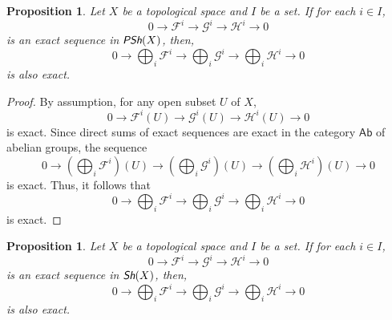 \documentclass[oneside,11pt]{amsart}
\newtheorem{prop}[thm]{Proposition}
\theoremstyle{definition}
\theoremstyle{remark}
\begin{document}
\begin{prop}\label{prop1}
 Let $X$ be a topological space and $I$ be a set. If for each $i\in I$,
 \begin{equation*}
 0 \longrightarrow  \mathscr{F}^{i} \longrightarrow \mathscr{G}^{i} \longrightarrow \mathscr{H}^{i} \longrightarrow 0  
 \end{equation*}
 is an exact sequence in $\emph{\textsf{PSh}}(X)$, then,
 \begin{equation*}
   0 \longrightarrow  \bigoplus_{i}\mathscr{F}^{i} \longrightarrow \bigoplus_{i}\mathscr{G}^{i} \longrightarrow \bigoplus_{i}\mathscr{H}^{i} \longrightarrow 0 
 \end{equation*}
 is also exact.
\end{prop}
\begin{proof}
By assumption, for any open subset $U$ of $X$,
\begin{equation*}
 0 \longrightarrow \mathscr{F}^{i}(U)  \longrightarrow \mathscr{G}^{i}(U) \longrightarrow \mathscr{H}^{i}(U) \longrightarrow 0
\end{equation*}
is exact. Since direct sums of exact sequences are exact in the category $\textsf{Ab}$ of abelian groups, the sequence
\begin{equation*}
 0 \longrightarrow \left(\bigoplus_{i} \mathscr{F}^{i}\right)(U)  \longrightarrow  \left(\bigoplus_{i}\mathscr{G}^{i}\right)(U) \longrightarrow \left(\bigoplus_{i}\mathscr{H}^{i}\right)(U) \longrightarrow 0
\end{equation*}
is exact. Thus, it follows that
\begin{equation*}
 0 \longrightarrow \bigoplus_{i}\mathscr{F}^{i} \longrightarrow \bigoplus_{i}\mathscr{G}^{i} \longrightarrow \bigoplus_{i}\mathscr{H}^{i} \longrightarrow 0
\end{equation*}
is exact.
\end{proof}
\begin{prop}\label{prop2}
 Let $X$ be a topological space and $I$ be a set. If for each $i\in I$,
 \begin{equation*}
 0 \longrightarrow  \mathscr{F}^{i} \longrightarrow \mathscr{G}^{i} \longrightarrow \mathscr{H}^{i} \longrightarrow 0  
 \end{equation*}
 is an exact sequence in $\emph{\textsf{Sh}}(X)$, then,
 \begin{equation}\label{eq2}
   0 \longrightarrow  \bigoplus_{i}\mathscr{F}^{i} \longrightarrow \bigoplus_{i}\mathscr{G}^{i} \longrightarrow \bigoplus_{i}\mathscr{H}^{i} \longrightarrow 0 
 \end{equation}
 is also exact.
\end{prop}
\end{document}
